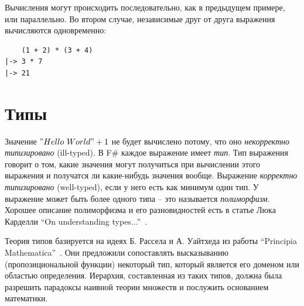 \documentclass[a4paper,11pt]{article}
\begin{document}
Вычисления могут происходить последовательно, как в предыдущем примере, или
параллельно. Во втором случае, независимые друг от друга выражения вычисляются
одновременно:
\begin{lstlisting}
    (1 + 2) * (3 + 4)
|-> 3 * 7
|-> 21
\end{lstlisting}

\section{Типы}

Значение $"Hello~World" + 1$ не будет вычислено потому, что оно
\emph{некорректно типизировано} (ill-typed). В F\# каждое выражение имеет
\emph{тип}. Тип выражения говорит о том, какие значения могут получиться при
вычислении этого выражения и получатся ли какие-нибудь значения вообще.
Выражение \emph{корректно типизировано} (well-typed), если у него есть как 
минимум один тип. У выражение может быть более одного типа -- это называется
\emph{полиморфизм}. Хорошее описание полиморфизма и его разновидностей есть в
статье Люка Карделли ``On understanding types...''~\cite{Cardelli}.

Теория типов базируется на идеях Б. Рассела и А. Уайтхеда из работы ``Principia
Mathematica''~\cite{Russell}. Они предложили сопоставлять высказыванию
(пропозициональной функции) некоторый тип, который является его доменом или
областью определения. Иерархия, составленная из таких типов, должна была
разрешить парадоксы наивной теории множеств и послужить основанием математики.
\end{document}
